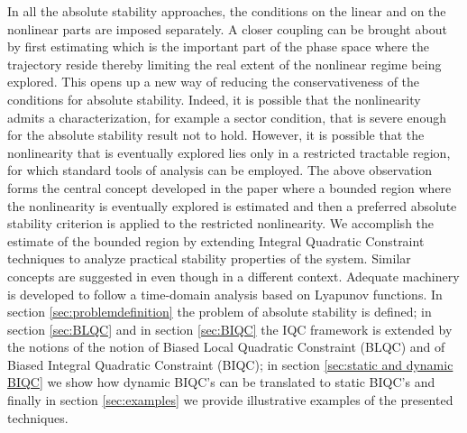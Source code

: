 \documentclass[letterpaper,10pt,conference,twocolumn]{IEEEtran}
\begin{document}
In all the absolute stability approaches, the conditions on the linear and on the nonlinear parts are imposed separately. A closer coupling can be brought about by first estimating which is the important part of the phase space where the trajectory reside thereby limiting the real extent of the nonlinear regime being explored. This opens up a new way of reducing the conservativeness of the conditions for absolute stability.
Indeed, it is possible that the nonlinearity admits a characterization, for example a sector condition, that is severe enough for the absolute stability result not to hold. However, it is possible that the nonlinearity that is eventually explored lies only in a restricted tractable region, for which standard tools of analysis can be employed.
The above observation forms the central concept developed in the paper where a bounded region where the nonlinearity is eventually explored is estimated and then a preferred absolute stability criterion is applied to the restricted nonlinearity.
We accomplish the estimate of the bounded region by extending Integral Quadratic Constraint techniques to analyze practical stability properties of the system. 
Similar concepts are suggested in \cite{Meg95} even though in a different context.
Adequate machinery is developed to follow a time-domain analysis based on Lyapunov functions.
In section \ref{sec:problemdefinition} the problem of absolute stability is defined; in section \ref{sec:BLQC} and in section \ref{sec:BIQC} the IQC framework is extended by the notions of the notion of Biased Local Quadratic Constraint (BLQC) and of Biased Integral Quadratic Constraint (BIQC); in section \ref{sec:static and dynamic BIQC} we show how dynamic BIQC's can be translated to static BIQC's and finally in section \ref{sec:examples} we provide illustrative examples of the presented techniques.
\end{document}
